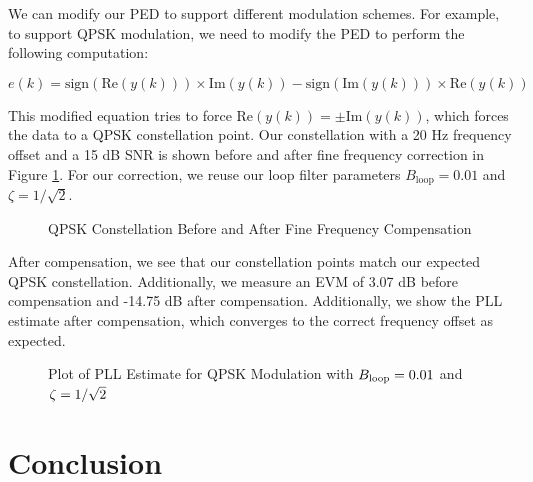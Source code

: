 \documentclass{article}
\begin{document}
We can modify our PED to support different modulation schemes. For example, to support QPSK modulation, we need to modify the PED to perform the following computation:

\begin{equation}
	e(k) = \text{sign}(\text{Re}(y(k))) \times \text{Im}(y(k)) - \text{sign}(\text{Im}(y(k))) \times \text{Re}(y(k))
\end{equation}

\noindent This modified equation tries to force $\text{Re}(y(k)) = \pm \text{Im}(y(k))$, which forces the data to a QPSK constellation point. Our constellation with a 20 Hz frequency offset and a 15 dB SNR is shown before and after fine frequency correction in Figure \ref{fig::fine_freq_comp_qpsk_const}. For our correction, we reuse our loop filter parameters $B_{\text{loop}}=0.01$ and $\zeta=1/\sqrt{2}$.

\begin{figure}[H]
	\centerline{}
	\caption{QPSK Constellation Before and After Fine Frequency Compensation}
	\label{fig::fine_freq_comp_qpsk_const}
\end{figure}

\noindent After compensation, we see that our constellation points match our expected QPSK constellation. Additionally, we measure an EVM of 3.07 dB before compensation and -14.75 dB after compensation. Additionally, we show the PLL estimate after compensation, which converges to the correct frequency offset as expected.

\begin{figure}[H]
	\centerline{}
	\caption{Plot of PLL Estimate for QPSK Modulation with $\protect{B_\text{loop}} = 0.01$ and $\protect{\zeta = 1/\sqrt{2}}$}
	\label{fig::convergence_qpsk_Bloop_0p01_damp_sqrt_2}
\end{figure}

\section{Conclusion}
\end{document}
